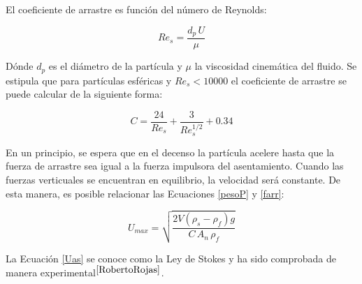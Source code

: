 \noindent
\justify

El coeficiente de arrastre es funci\'on del n\'umero de Reynolds:

\begin{equation}
	Re _s = \frac{d_p \, U}{\mu}
	\label{Res}
\end{equation}

\noindent
\justify

D\'onde $d_p$ es el di\'ametro de la part\'icula y $\mu$ la viscosidad cinem\'atica del fluido. Se estipula que para part\'iculas esf\'ericas y $Re _s < 10000$ el coeficiente de arrastre se puede calcular de la siguiente forma:

\begin{equation}
	C = \frac{24}{Re_s} + \frac{3}{Re _s ^{1/2}} + 0.34
	\label{CoefArr}
\end{equation}

\noindent
\justify

En un principio, se espera que en el decenso la part\'icula acelere hasta que la fuerza de arrastre sea igual a la fuerza impulsora del asentamiento. Cuando las fuerzas verticuales se encuentran en equilibrio, la velocidad ser\'a constante. De esta manera, es posible relacionar las Ecuaciones \ref{pesoP} y \ref{farr}:

\begin{equation}
	U_{max} = \sqrt{\frac{2 V \left(\rho _s - \rho _f \right) g}{C \, A_n \, \rho _f}}
	\label{Uas}
\end{equation}

\noindent
\justify

La Ecuaci\'on \ref{Uas} se conoce como la Ley de Stokes y ha sido comprobada de manera experimental$^{\cite{RobertoRojas}}$. 